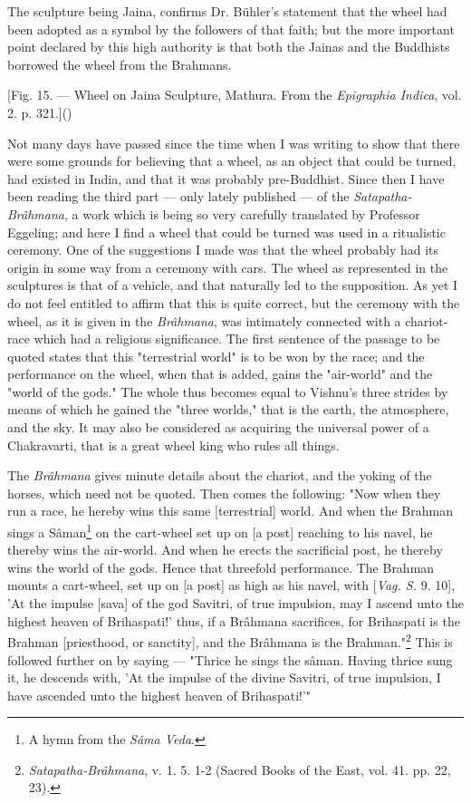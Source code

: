 \documentclass[a4paper, 11pt, oneside, polutonikogreek, english]{article}
\begin{document}
The sculpture being Jaina, confirms Dr. Bühler's statement that the wheel had been adopted as a symbol by the followers of that faith; but the more important point declared by this high authority is that both the Jainas and the Buddhists borrowed the wheel from the Brahmans.

[Fig. 15. --- Wheel on Jaina Sculpture, Mathura. From the \emph{Epigraphia Indica}, vol. 2. p. 321.]()

Not many days have passed since the time when I was writing to show that there were some grounds for believing that a wheel, as an object that could be turned, had existed in India, and that it was probably pre-Buddhist. Since then I have been reading the third part --- only lately published --- of the \emph{Satapatha-Brâhmana}, a work which is being so very carefully translated by Professor Eggeling; and here I find a wheel that could be turned was used in a ritualistic ceremony. One of the suggestions I made was that the wheel probably had its origin in some way from a ceremony with cars. The wheel as represented in the sculptures is that of a vehicle, and that naturally led to the supposition. As yet I do not feel entitled to affirm that this is quite correct, but the ceremony with the wheel, as it is given in the \emph{Brâhmana}, was intimately connected with a chariot-race which had a religious significance. The first sentence of the passage to be quoted states that this "terrestrial world" is to be won by the race; and the performance on the wheel, when that is added, gains the "air-world" and the "world of the gods." The whole thus becomes equal to Vishnu's three strides by means of which he gained the "three worlds," that is the earth, the atmosphere, and the sky. It may also be considered as acquiring the universal power of a Chakravarti, that is a great wheel king who rules all things.

The \emph{Brâhmana} gives minute details about the chariot, and the yoking of the horses, which need not be quoted. Then comes the following: "Now when they run a race, he hereby wins this same [terrestrial] world. And when the Brahman sings a Sâman\footnote{A hymn from the \emph{Sâma Veda}.} on the cart-wheel set up on [a post] reaching to his navel, he thereby wins the air-world. And when he erects the sacrificial post, he thereby wins the world of the gods. Hence that threefold performance. The Brahman mounts a cart-wheel, set up on [a post] as high as his navel, with [\emph{Vag. S.} 9. 10], 'At the impulse [sava] of the god Savitri, of true impulsion, may I ascend unto the highest heaven of Brihaspati!' thus, if a Brâhmana sacrifices, for Brihaspati is the Brahman [priesthood, or sanctity], and the Brâhmana is the Brahman."\footnote{\emph{Satapatha-Brâhmana}, v. 1. 5. 1-2 (Sacred Books of the East, vol. 41. pp. 22, 23).} This is followed further on by saying --- "Thrice he sings the sâman. Having thrice sung it, he descends with, 'At the impulse of the divine Savitri, of true impulsion, I have ascended unto the highest heaven of Brihaspati!'"
\end{document}
